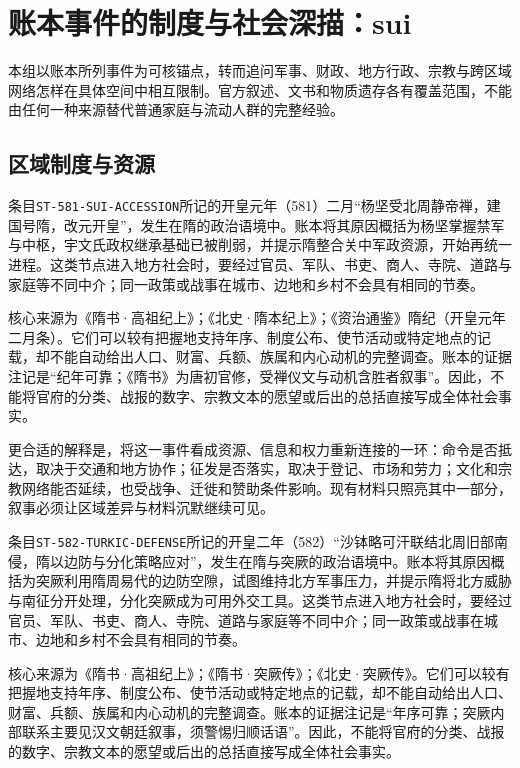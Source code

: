 \section{账本事件的制度与社会深描：sui}

\label{sec:ledger-depth-sui}

本组以账本所列事件为可核锚点，转而追问军事、财政、地方行政、宗教与跨区域网络怎样在具体空间中相互限制。官方叙述、文书和物质遗存各有覆盖范围，不能由任何一种来源替代普通家庭与流动人群的完整经验。

\subsection{区域制度与资源}


条目\texttt{ST-581-SUI-ACCESSION}所记的开皇元年（581）二月“杨坚受北周静帝禅，建国号隋，改元开皇”，发生在隋的政治语境中。账本将其原因概括为杨坚掌握禁军与中枢，宇文氏政权继承基础已被削弱，并提示隋整合关中军政资源，开始再统一进程。这类节点进入地方社会时，要经过官员、军队、书吏、商人、寺院、道路与家庭等不同中介；同一政策或战事在城市、边地和乡村不会具有相同的节奏。

核心来源为《隋书·高祖纪上》；《北史·隋本纪上》；《资治通鉴》隋纪（开皇元年二月条）。它们可以较有把握地支持年序、制度公布、使节活动或特定地点的记载，却不能自动给出人口、财富、兵额、族属和内心动机的完整调查。账本的证据注记是“纪年可靠；《隋书》为唐初官修，受禅仪文与动机含胜者叙事”。因此，不能将官府的分类、战报的数字、宗教文本的愿望或后出的总括直接写成全体社会事实。

更合适的解释是，将这一事件看成资源、信息和权力重新连接的一环：命令是否抵达，取决于交通和地方协作；征发是否落实，取决于登记、市场和劳力；文化和宗教网络能否延续，也受战争、迁徙和赞助条件影响。现有材料只照亮其中一部分，叙事必须让区域差异与材料沉默继续可见。


条目\texttt{ST-582-TURKIC-DEFENSE}所记的开皇二年（582）“沙钵略可汗联结北周旧部南侵，隋以边防与分化策略应对”，发生在隋与突厥的政治语境中。账本将其原因概括为突厥利用隋周易代的边防空隙，试图维持北方军事压力，并提示隋将北方威胁与南征分开处理，分化突厥成为可用外交工具。这类节点进入地方社会时，要经过官员、军队、书吏、商人、寺院、道路与家庭等不同中介；同一政策或战事在城市、边地和乡村不会具有相同的节奏。

核心来源为《隋书·高祖纪上》；《隋书·突厥传》；《北史·突厥传》。它们可以较有把握地支持年序、制度公布、使节活动或特定地点的记载，却不能自动给出人口、财富、兵额、族属和内心动机的完整调查。账本的证据注记是“年序可靠；突厥内部联系主要见汉文朝廷叙事，须警惕归顺话语”。因此，不能将官府的分类、战报的数字、宗教文本的愿望或后出的总括直接写成全体社会事实。

